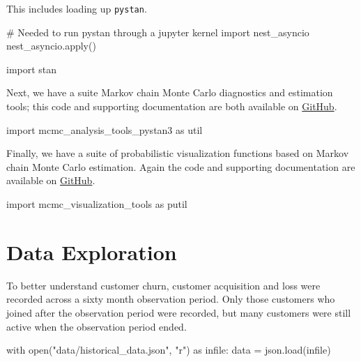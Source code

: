 \documentclass[
  letterpaper,
  DIV=11,
  numbers=noendperiod]{scrartcl}
\newenvironment{Shaded}{\begin{snugshade}}{\end{snugshade}}
\newcommand{\BuiltInTok}[1]{\textcolor[rgb]{0.00,0.23,0.31}{#1}}
\newcommand{\CommentTok}[1]{\textcolor[rgb]{0.37,0.37,0.37}{#1}}
\newcommand{\ControlFlowTok}[1]{\textcolor[rgb]{0.00,0.23,0.31}{#1}}
\newcommand{\ImportTok}[1]{\textcolor[rgb]{0.00,0.46,0.62}{#1}}
\newcommand{\NormalTok}[1]{\textcolor[rgb]{0.00,0.23,0.31}{#1}}
\newcommand{\OperatorTok}[1]{\textcolor[rgb]{0.37,0.37,0.37}{#1}}
\newcommand{\StringTok}[1]{\textcolor[rgb]{0.13,0.47,0.30}{#1}}
\begin{document}
This includes loading up \texttt{pystan}.

\begin{Shaded}
\begin{Highlighting}[]
\CommentTok{\# Needed to run pystan through a jupyter kernel}
\ImportTok{import}\NormalTok{ nest\_asyncio}
\NormalTok{nest\_asyncio.}\BuiltInTok{apply}\NormalTok{()}

\ImportTok{import}\NormalTok{ stan}
\end{Highlighting}
\end{Shaded}

Next, we have a suite Markov chain Monte Carlo diagnostics and
estimation tools; this code and supporting documentation are both
available on
\href{https://github.com/betanalpha/mcmc_diagnostics}{GitHub}.

\begin{Shaded}
\begin{Highlighting}[]
\ImportTok{import}\NormalTok{ mcmc\_analysis\_tools\_pystan3 }\ImportTok{as}\NormalTok{ util}
\end{Highlighting}
\end{Shaded}

Finally, we have a suite of probabilistic visualization functions based
on Markov chain Monte Carlo estimation. Again the code and supporting
documentation are available on
\href{https://github.com/betanalpha/mcmc_visualization_tools}{GitHub}.

\begin{Shaded}
\begin{Highlighting}[]
\ImportTok{import}\NormalTok{ mcmc\_visualization\_tools }\ImportTok{as}\NormalTok{ putil}
\end{Highlighting}
\end{Shaded}

\section{Data Exploration}\label{data-exploration}

To better understand customer churn, customer acquisition and loss were
recorded across a sixty month observation period. Only those customers
who joined after the observation period were recorded, but many
customers were still active when the observation period ended.

\begin{Shaded}
\begin{Highlighting}[]
\ControlFlowTok{with} \BuiltInTok{open}\NormalTok{(}\StringTok{"data/historical\_data.json"}\NormalTok{, }\StringTok{"r"}\NormalTok{) }\ImportTok{as}\NormalTok{ infile:}
\NormalTok{  data }\OperatorTok{=}\NormalTok{ json.load(infile)}
\end{Highlighting}
\end{Shaded}
\end{document}
